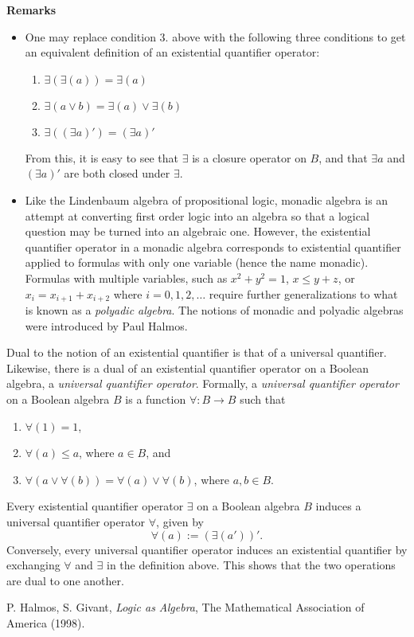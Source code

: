 \documentclass[12pt]{article}
\begin{document}
\textbf{Remarks}
\begin{itemize}
\item One may replace condition 3. above with the following three conditions to get an equivalent definition of an existential quantifier operator:
\begin{enumerate}
\item $\exists(\exists(a)) = \exists(a)$
\item $\exists (a\vee b)=\exists(a) \vee \exists(b)$
\item $\exists ((\exists a)')=(\exists a)'$
\end{enumerate}
From this, it is easy to see that $\exists$ is a closure operator on $B$, and that $\exists a$ and $(\exists a)'$ are both closed under $\exists$.
\item Like the Lindenbaum algebra of propositional logic, monadic algebra is an attempt at converting first order logic into an algebra so that a logical question may be turned into an algebraic one.  However, the existential quantifier operator in a monadic algebra corresponds to existential quantifier applied to formulas with only one variable (hence the name monadic).  Formulas with multiple variables, such as $x^2+y^2=1$, $x\le y+z$, or $x_i=x_{i+1}+x_{i+2}$ where $i=0,1,2,\ldots$ require further generalizations to what is known as a \emph{polyadic algebra}.  The notions of monadic and polyadic algebras were introduced by Paul Halmos.
\end{itemize}

Dual to the notion of an existential quantifier is that of a universal quantifier.  Likewise, there is a dual of an existential quantifier operator on a Boolean algebra, a \emph{universal quantifier operator}.  Formally, a \emph{universal quantifier operator} on a Boolean algebra $B$ is a function $\forall : B\to B$ such that
\begin{enumerate}
\item $\forall (1) = 1$,
\item $\forall (a) \le a$, where $a\in B$, and
\item $\forall(a \vee \forall(b)) = \forall(a) \vee \forall(b)$, where $a,b\in B$.
\end{enumerate}

Every existential quantifier operator $\exists$ on a Boolean algebra $B$ induces a universal quantifier operator $\forall$, given by $$\forall (a) := (\exists (a'))'.$$  Conversely, every universal quantifier operator induces an existential quantifier by exchanging $\forall$ and $\exists$ in the definition above.  This shows that the two operations are dual to one another.

\begin{thebibliography}{8}
 P. Halmos, S. Givant, \emph{Logic as Algebra}, The Mathematical Association of America (1998).
\end{thebibliography}
\end{document}
